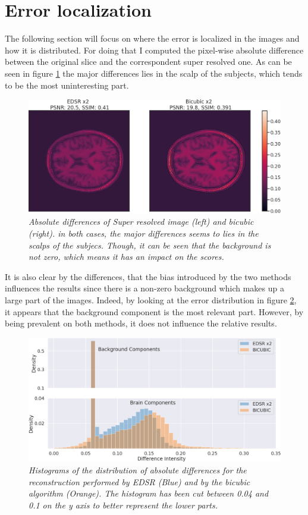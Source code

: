 \documentclass[12pt,a4paper]{report}
\begin{document}
\section{Error localization}

The following section will focus on where the error is localized in the images and how it is distributed. 
For doing that I computed the pixel-wise absolute difference between the original slice and the correspondent super resolved one. As can be seen in figure \ref{fig:abs_diff_x2} the major differences lies in the scalp of the subjects, which tends to be the most uninteresting part.

\begin{figure}[H]
 \centering
 \includegraphics[scale=0.4]{./images/diff-edsr.png}
 \caption{\it Absolute differences of Super resolved image (left) and bicubic (right). in both cases, the major differences seems to lies in the scalps of the subjecs. Though, it can be seen that the background is not zero, which means it has an impact on the scores.}
 \label{fig:abs_diff_x2}
\end{figure}

It is also clear by the differences, that the bias introduced by the two methods influences the results since there is a non-zero background which makes up a large part of the images. Indeed, by looking at the error distribution in figure \ref{fig:histo-edsr}, it appears that the background component is the most relevant part. 
However, by being prevalent on both methods, it does not influence the relative results.

\begin{figure}[H]
 \centering
 \includegraphics[scale=.4]{./images/histo-edsr.png}
 \caption{\it Histograms of the distribution of absolute differences for the reconstruction performed by EDSR (Blue) and by the bicubic algorithm (Orange). The histogram has been cut between 0.04 and 0.1 on the y axis to better represent the lower parts.}
 \label{fig:histo-edsr}
\end{figure}
\end{document}
